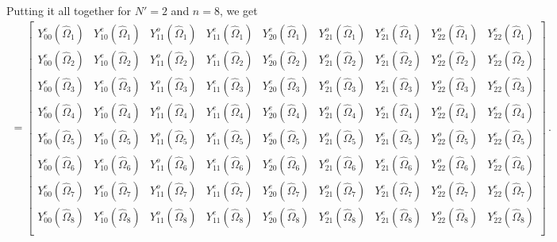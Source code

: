 \documentclass[10pt]{article}
\begin{document}
Putting it all together for $N'=2$ and $n=8$, we get
%
\begin{align*}
[\textbf{M}] = 
\begin{bmatrix}
   Y_{00}^e(\hat{\Omega}_1) & Y_{10}^e(\hat{\Omega}_1) & Y_{11}^o(\hat{\Omega}_1) & Y_{11}^e(\hat{\Omega}_1) & Y_{20}^e(\hat{\Omega}_1) & Y_{21}^o(\hat{\Omega}_1) & Y_{21}^e(\hat{\Omega}_1) & Y_{22}^o(\hat{\Omega}_1) & Y_{22}^e(\hat{\Omega}_1)  \\
      Y_{00}^e(\hat{\Omega}_2) & Y_{10}^e(\hat{\Omega}_2) & Y_{11}^o(\hat{\Omega}_2) & Y_{11}^e(\hat{\Omega}_2) & Y_{20}^e(\hat{\Omega}_2) & Y_{21}^o(\hat{\Omega}_2) & Y_{21}^e(\hat{\Omega}_2) & Y_{22}^o(\hat{\Omega}_2) & Y_{22}^e(\hat{\Omega}_2)  \\
         Y_{00}^e(\hat{\Omega}_3) & Y_{10}^e(\hat{\Omega}_3) & Y_{11}^o(\hat{\Omega}_3) & Y_{11}^e(\hat{\Omega}_3) & Y_{20}^e(\hat{\Omega}_3) & Y_{21}^o(\hat{\Omega}_3) & Y_{21}^e(\hat{\Omega}_3) & Y_{22}^o(\hat{\Omega}_3) & Y_{22}^e(\hat{\Omega}_3)  \\
            Y_{00}^e(\hat{\Omega}_4) & Y_{10}^e(\hat{\Omega}_4) & Y_{11}^o(\hat{\Omega}_4) & Y_{11}^e(\hat{\Omega}_4) & Y_{20}^e(\hat{\Omega}_4) & Y_{21}^o(\hat{\Omega}_4) & Y_{21}^e(\hat{\Omega}_4) & Y_{22}^o(\hat{\Omega}_4) & Y_{22}^e(\hat{\Omega}_4)  \\
               Y_{00}^e(\hat{\Omega}_5) & Y_{10}^e(\hat{\Omega}_5) & Y_{11}^o(\hat{\Omega}_5) & Y_{11}^e(\hat{\Omega}_5) & Y_{20}^e(\hat{\Omega}_5) & Y_{21}^o(\hat{\Omega}_5) & Y_{21}^e(\hat{\Omega}_5) & Y_{22}^o(\hat{\Omega}_5) & Y_{22}^e(\hat{\Omega}_5)  \\
                  Y_{00}^e(\hat{\Omega}_6) & Y_{10}^e(\hat{\Omega}_6) & Y_{11}^o(\hat{\Omega}_6) & Y_{11}^e(\hat{\Omega}_6) & Y_{20}^e(\hat{\Omega}_6) & Y_{21}^o(\hat{\Omega}_6) & Y_{21}^e(\hat{\Omega}_6) & Y_{22}^o(\hat{\Omega}_6) & Y_{22}^e(\hat{\Omega}_6)  \\
                     Y_{00}^e(\hat{\Omega}_7) & Y_{10}^e(\hat{\Omega}_7) & Y_{11}^o(\hat{\Omega}_7) & Y_{11}^e(\hat{\Omega}_7) & Y_{20}^e(\hat{\Omega}_7) & Y_{21}^o(\hat{\Omega}_7) & Y_{21}^e(\hat{\Omega}_7) & Y_{22}^o(\hat{\Omega}_7) & Y_{22}^e(\hat{\Omega}_7)  \\
                        Y_{00}^e(\hat{\Omega}_8) & Y_{10}^e(\hat{\Omega}_8) & Y_{11}^o(\hat{\Omega}_8) & Y_{11}^e(\hat{\Omega}_8) & Y_{20}^e(\hat{\Omega}_8) & Y_{21}^o(\hat{\Omega}_8) & Y_{21}^e(\hat{\Omega}_8) & Y_{22}^o(\hat{\Omega}_8) & Y_{22}^e(\hat{\Omega}_8)  \\
\end{bmatrix}\,.
\end{align*}
\end{document}
